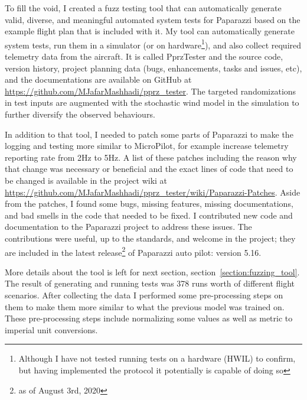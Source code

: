 To fill the void, I created a fuzz testing tool that can automatically generate valid, diverse, and meaningful automated system tests for Paparazzi based on the example flight plan that is included with it.
My tool can automatically generate system tests, run them in a simulator (or on hardware\footnote{Although I have not tested running tests on a hardware (HWIL) to confirm, but having implemented the protocol it potentially is capable of doing so}), and also collect required telemetry data from the aircraft. 
It is called PprzTester and the source code, version history, project planning data (bugs, enhancements, tasks and issues, etc), and the documentations are available on GitHub at \url{https://github.com/MJafarMashhadi/pprz_tester}. 
The targeted randomizations in test inputs are augmented with the stochastic wind model in the simulation to further diversify the observed behaviours.

In addition to that tool, I needed to patch some parts of Paparazzi to make the logging and testing more similar to MicroPilot, for example increase telemetry reporting rate from 2Hz to 5Hz. A list of these patches including the reason why that change was necessary or beneficial and the exact lines of code that need to be changed is available in the project wiki at \url{https://github.com/MJafarMashhadi/pprz_tester/wiki/Paparazzi-Patches}.
Aside from the patches, I found some bugs, missing features, missing documentations, and bad smells in the code that needed to be fixed. I contributed new code and documentation to the Paparazzi project to address these issues. The contributions were useful, up to the standards, and welcome in the project; they are included in the latest release\footnote{as of August 3rd, 2020} of Paparazzi auto pilot: version 5.16.

More details about the tool is left for next section, section~\ref{section:fuzzing_tool}.
The result of generating and running tests was 378 runs worth of different flight scenarios.
After collecting the data I performed some pre-processing steps on them to make them more similar to what the previous model was trained on. These pre-processing steps include normalizing some values as well as metric to imperial unit conversions.

